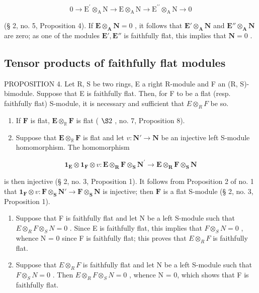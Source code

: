 \[
0 \rightarrow \mathrm{E} ^ {\prime} \otimes_ {\mathrm{A}} \mathrm{N} \rightarrow \mathrm{E} \otimes_ {\mathrm{A}} \mathrm{N} \rightarrow \mathrm{E} ^ {\prime \prime} \otimes_ {\mathrm{A}} \mathrm{N} \rightarrow 0
\]

(§ 2, no. 5, Proposition 4). If \(\mathbf{E} \otimes_{\mathbf{A}} \mathbf{N} = 0\) , it follows that \(\mathbf{E}' \otimes_{\mathbf{A}} \mathbf{N}\) and \(\mathbf{E}'' \otimes_{\mathbf{A}} \mathbf{N}\) are zero; as one of the modules \(\mathbf{E}', \mathbf{E}''\) is faithfully flat, this implies that \(\mathbf{N} = 0\) .

\subsection{Tensor products of faithfully flat modules}

PROPOSITION 4. Let R, S be two rings, E a right R-module and F an (R, S)-bimodule. Suppose that E is faithfully flat. Then, for F to be a flat (resp. faithfully flat) S-module, it is necessary and sufficient that \(E \otimes_{R} F\) be so.

\begin{enumerate}
\def\labelenumi{(\arabic{enumi})}
\item
  If \(\mathbf{F}\) is flat, \(\mathbf{E} \otimes_{\mathbb{R}} \mathbf{F}\) is flat ( \(\S 2\) , no. 7, Proposition 8).
\item
  Suppose that \(\mathbf{E} \otimes_{\mathbb{R}} \mathbf{F}\) is flat and let \(v: \mathbf{N}' \to \mathbf{N}\) be an injective left S-module homomorphism. The homomorphism
\end{enumerate}

\[
  \mathbf {1} _ {\mathbf {E}} \otimes \mathbf {1} _ {\mathbf {F}} \otimes v: \mathbf {E} \otimes_ {\mathbf {R}} \mathbf {F} \otimes_ {\mathbf {S}} \mathbf {N} ^ {\prime} \rightarrow \mathbf {E} \otimes_ {\mathbf {R}} \mathbf {F} \otimes_ {\mathbf {S}} \mathbf {N}
\]

is then injective (§ 2, no. 3, Proposition 1). It follows from Proposition 2 of no. 1 that \(\mathbf{1}_{\mathbf{F}} \otimes v \colon \mathbf{F} \otimes_{\mathbf{S}} \mathbf{N}' \to \mathbf{F} \otimes_{\mathbf{S}} \mathbf{N}\) is injective; then \(\mathbf{F}\) is a flat S-module (§ 2, no. 3, Proposition 1).

\begin{enumerate}
\def\labelenumi{(\arabic{enumi})}
\setcounter{enumi}{2}
\item
  Suppose that F is faithfully flat and let N be a left S-module such that \(E \otimes_{R} F \otimes_{S} N = 0\) . Since E is faithfully flat, this implies that \(F \otimes_{S} N = 0\) , whence N = 0 since F is faithfully flat; this proves that \(E \otimes_{R} F\) is faithfully flat.
\item
  Suppose that \(E \otimes_{R} F\) is faithfully flat and let N be a left S-module such that \(F \otimes_{S} N = 0\) . Then \(E \otimes_{R} F \otimes_{S} N = 0\) , whence N = 0, which shows that F is faithfully flat.
\end{enumerate}

